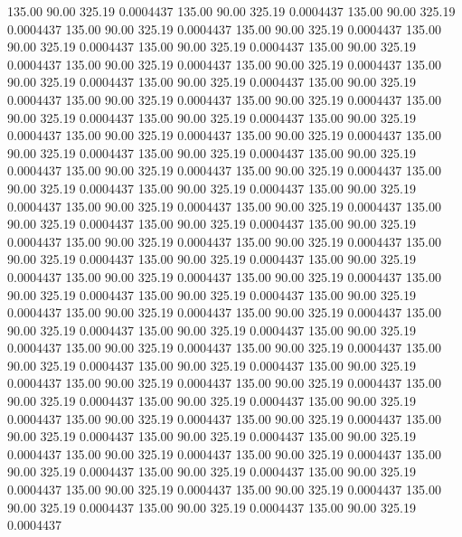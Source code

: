  135.00   90.00  325.19   0.0004437
 135.00   90.00  325.19   0.0004437
 135.00   90.00  325.19   0.0004437
 135.00   90.00  325.19   0.0004437
 135.00   90.00  325.19   0.0004437
 135.00   90.00  325.19   0.0004437
 135.00   90.00  325.19   0.0004437
 135.00   90.00  325.19   0.0004437
 135.00   90.00  325.19   0.0004437
 135.00   90.00  325.19   0.0004437
 135.00   90.00  325.19   0.0004437
 135.00   90.00  325.19   0.0004437
 135.00   90.00  325.19   0.0004437
 135.00   90.00  325.19   0.0004437
 135.00   90.00  325.19   0.0004437
 135.00   90.00  325.19   0.0004437
 135.00   90.00  325.19   0.0004437
 135.00   90.00  325.19   0.0004437
 135.00   90.00  325.19   0.0004437
 135.00   90.00  325.19   0.0004437
 135.00   90.00  325.19   0.0004437
 135.00   90.00  325.19   0.0004437
 135.00   90.00  325.19   0.0004437
 135.00   90.00  325.19   0.0004437
 135.00   90.00  325.19   0.0004437
 135.00   90.00  325.19   0.0004437
 135.00   90.00  325.19   0.0004437
 135.00   90.00  325.19   0.0004437
 135.00   90.00  325.19   0.0004437
 135.00   90.00  325.19   0.0004437
 135.00   90.00  325.19   0.0004437
 135.00   90.00  325.19   0.0004437
 135.00   90.00  325.19   0.0004437
 135.00   90.00  325.19   0.0004437
 135.00   90.00  325.19   0.0004437
 135.00   90.00  325.19   0.0004437
 135.00   90.00  325.19   0.0004437
 135.00   90.00  325.19   0.0004437
 135.00   90.00  325.19   0.0004437
 135.00   90.00  325.19   0.0004437
 135.00   90.00  325.19   0.0004437
 135.00   90.00  325.19   0.0004437
 135.00   90.00  325.19   0.0004437
 135.00   90.00  325.19   0.0004437
 135.00   90.00  325.19   0.0004437
 135.00   90.00  325.19   0.0004437
 135.00   90.00  325.19   0.0004437
 135.00   90.00  325.19   0.0004437
 135.00   90.00  325.19   0.0004437
 135.00   90.00  325.19   0.0004437
 135.00   90.00  325.19   0.0004437
 135.00   90.00  325.19   0.0004437
 135.00   90.00  325.19   0.0004437
 135.00   90.00  325.19   0.0004437
 135.00   90.00  325.19   0.0004437
 135.00   90.00  325.19   0.0004437
 135.00   90.00  325.19   0.0004437
 135.00   90.00  325.19   0.0004437
 135.00   90.00  325.19   0.0004437
 135.00   90.00  325.19   0.0004437
 135.00   90.00  325.19   0.0004437
 135.00   90.00  325.19   0.0004437
 135.00   90.00  325.19   0.0004437
 135.00   90.00  325.19   0.0004437
 135.00   90.00  325.19   0.0004437
 135.00   90.00  325.19   0.0004437
 135.00   90.00  325.19   0.0004437
 135.00   90.00  325.19   0.0004437
 135.00   90.00  325.19   0.0004437
 135.00   90.00  325.19   0.0004437
 135.00   90.00  325.19   0.0004437
 135.00   90.00  325.19   0.0004437
 135.00   90.00  325.19   0.0004437
